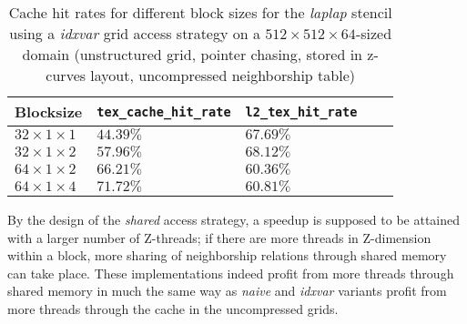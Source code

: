 \begin{table}
	\begin{tabular}{l l l l l}
		Blocksize & \texttt{tex\_cache\_hit\_rate} & \texttt{l2\_tex\_hit\_rate} \\
		\hline
		$32\times 1\times 1$ & $44.39\%$ & $67.69\%$ \\
		$32\times 1\times 2$ & $57.96\%$ & $68.12\%$ \\
		$64\times 1\times 2$ & $66.21\%$ & $60.36\%$ \\
		$64\times 1\times 4$ & $71.72\%$ & $60.81\%$
	\end{tabular}
	\caption{\label{tab:laplap-blocksize-metrics} Cache hit rates for different block sizes for the \emph{laplap} stencil using a \emph{idxvar} grid access strategy on a $512\times 512\times 64$-sized domain (unstructured grid, pointer chasing, stored in z-curves layout, uncompressed neighborship table)}
\end{table}

By the design of the \emph{shared} access strategy, a speedup is supposed to be attained with a larger number of Z-threads; if there are more threads in Z-dimension within a block, more sharing of neighborship relations through shared memory can take place. These implementations indeed profit from more threads through shared memory in much the same way as \emph{naive} and \emph{idxvar} variants profit from more threads through the cache in the uncompressed grids.


